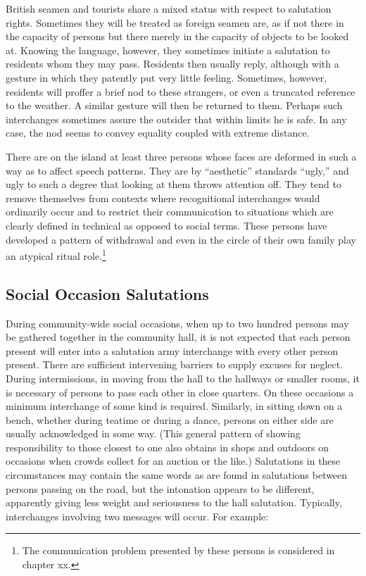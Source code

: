 \documentclass[twoside,symmetric,nobib,justified]{tufte-book}
\begin{document}
British seamen and tourists share a mixed status with respect to
salutation rights. Sometimes they will be treated as foreign seamen are,
as if not there in the capacity of persons but there merely in the
capacity of objects to be looked at. Knowing the language, however, they
sometimes initiate a salutation to residents whom they may pass.
Residents then usually reply, although with a gesture in which they
patently put very little feeling. Sometimes, however, residents will
proffer a brief nod to these strangers, or even a truncated reference to
the weather. A similar gesture will then be returned to them. Perhaps
such interchanges sometimes assure the outsider that within limits he is
safe. In any case, the nod seems to convey equality coupled with extreme
distance.

There are on the island at least three persons whose faces are deformed
in such a way as to affect speech patterns. They are by ``aesthetic''
standards ``ugly,'' and ugly to such a degree that looking at them
throws attention off. They tend to remove themselves from contexts where
recognitional interchanges would ordinarily occur and to restrict their
communication to situations which are clearly defined in technical as
opposed to social terms. These persons have developed a pattern of
withdrawal and even in the circle of their own family play an atypical
ritual role.\footnote{The communication problem presented by these
  persons is considered in chapter xx.}

\hypertarget{social-occasion-salutations}{%
\subsection{Social Occasion
Salutations}\label{social-occasion-salutations}}

During community-wide social occasions, when up to two hundred persons
may be gathered together in the community hall, it is not expected that
each person present will enter into a salutation army interchange with
every other person present. There are sufficient intervening barriers to
supply excuses for neglect. During intermissions, in moving from the
hall to the hallways or smaller rooms, it is necessary of persons to
pass each other in close quarters. On these occasions a minimum
interchange of some kind is required. Similarly, in sitting down on a
bench, whether during teatime or during a dance, persons on either side
are usually acknowledged in some way. (This general pattern of showing
responsibility to those closest to one also obtains in shops and
outdoors on occasions when crowds collect for an auction or the like.)
Salutations in these circumstances may contain the same words as are
found in salutations between persons passing on the road, but the
intonation appears to be different, apparently giving less weight and
seriousness to the hall salutation. Typically, interchanges involving
two messages will occur. For example:
\end{document}
